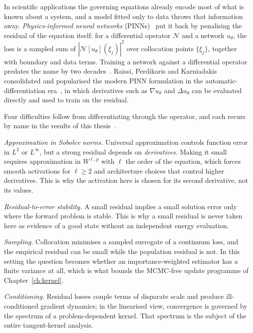 In scientific applications the governing equations already encode most of what is known
about a system, and a model fitted only to data throws that information away.
\emph{Physics-informed neural networks} (PINNs)~\cite{raissi2019pinns} put it back by
penalising the residual of the equation itself: for a differential operator $\mathcal N$ and
a network $u_\theta$, the loss is a sampled sum of $|\mathcal N[u_\theta](\xi_j)|^2$ over
collocation points $\{\xi_j\}$, together with boundary and data terms. Training a network
against a differential operator predates the name by two
decades~\cite{Lagaris1998-ANNforODEPDE}. Raissi, Perdikaris and Karniadakis consolidated and
popularised the modern PINN formulation in the automatic-differentiation
era~\cite{raissi2019pinns}, in which derivatives such as $\nabla u_\theta$ and
$\Delta u_\theta$ can be evaluated directly and used to train on the residual.

Four difficulties follow from differentiating through the operator, and each recurs by name
in the results of this thesis~\cite{De_Ryck_2024}.

\emph{Approximation in Sobolev norms.} Universal approximation controls function error in
$L^2$ or $L^\infty$, but a strong residual depends on \emph{derivatives}. Making it small
requires approximation in $W^{\ell,p}$ with $\ell$ the order of the equation, which forces
smooth activations for $\ell\ge2$ and architecture choices that control higher derivatives.
This is why the activation here is chosen for its second derivative, not its values.

\emph{Residual-to-error stability.} A small residual implies a small solution error only
where the forward problem is stable. This is why a small residual is never taken here as
evidence of a good state without an independent energy evaluation.

\emph{Sampling.} Collocation minimises a sampled surrogate of a continuum loss, and the
empirical residual can be small while the population residual is not. In this setting the
question becomes whether an importance-weighted estimator has a finite variance at all,
which is what bounds the MCMC-free update programme of Chapter~\ref{ch:kernel}.

\emph{Conditioning.} Residual losses couple terms of disparate scale and produce
ill-conditioned gradient dynamics; in the linearised view, convergence is governed by the
spectrum of a problem-dependent kernel. That spectrum is the subject of the entire
tangent-kernel analysis.

